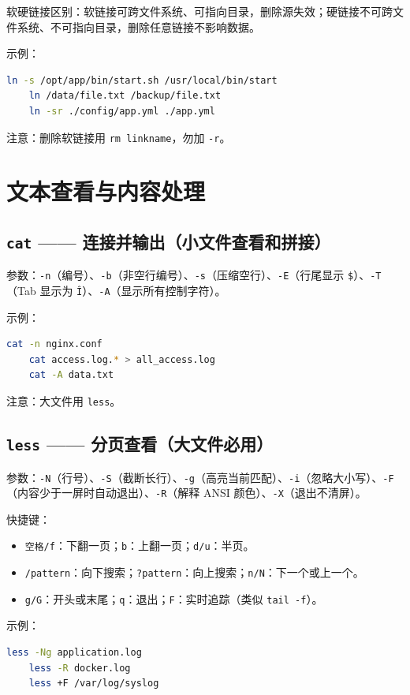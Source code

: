 软硬链接区别：软链接可跨文件系统、可指向目录，删除源失效；硬链接不可跨文件系统、不可指向目录，删除任意链接不影响数据。

示例：
\begin{lstlisting}[language=bash]
	ln -s /opt/app/bin/start.sh /usr/local/bin/start
	ln /data/file.txt /backup/file.txt
	ln -sr ./config/app.yml ./app.yml
\end{lstlisting}

注意：删除软链接用 \texttt{rm linkname}，勿加 \texttt{-r}。

\section{文本查看与内容处理}

\subsection*{\texttt{cat} —— 连接并输出（小文件查看和拼接）} 参数：\texttt{-n}（编号）、\texttt{-b}（非空行编号）、\texttt{-s}（压缩空行）、\texttt{-E}（行尾显示 \texttt{\$}）、\texttt{-T}（Tab 显示为 \texttt{\^I}）、\texttt{-A}（显示所有控制字符）。

示例：
\begin{lstlisting}[language=bash]
	cat -n nginx.conf
	cat access.log.* > all_access.log
	cat -A data.txt
\end{lstlisting}

注意：大文件用 \texttt{less}。

\subsection*{\texttt{less} —— 分页查看（大文件必用）} 参数：\texttt{-N}（行号）、\texttt{-S}（截断长行）、\texttt{-g}（高亮当前匹配）、\texttt{-i}（忽略大小写）、\texttt{-F}（内容少于一屏时自动退出）、\texttt{-R}（解释 ANSI 颜色）、\texttt{-X}（退出不清屏）。

快捷键：
\begin{itemize}
\item \texttt{空格/f}：下翻一页；\texttt{b}：上翻一页；\texttt{d/u}：半页。
\item \texttt{/pattern}：向下搜索；\texttt{?pattern}：向上搜索；\texttt{n/N}：下一个或上一个。
\item \texttt{g/G}：开头或末尾；\texttt{q}：退出；\texttt{F}：实时追踪（类似 \texttt{tail -f}）。
\end{itemize}

示例：
\begin{lstlisting}[language=bash]
	less -Ng application.log
	less -R docker.log
	less +F /var/log/syslog
\end{lstlisting}

